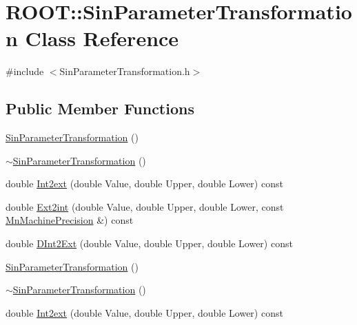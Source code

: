 \hypertarget{classROOT_1_1Minuit2_1_1SinParameterTransformation}{}\section{R\+O\+OT\+:\+:Sin\+Parameter\+Transformation Class Reference}
\label{classROOT_1_1Minuit2_1_1SinParameterTransformation}


{\ttfamily \#include $<$Sin\+Parameter\+Transformation.\+h$>$}

\subsection*{Public Member Functions}
\begin{DoxyCompactItemize}
\item 
\mbox{\hyperlink{classROOT_1_1Minuit2_1_1SinParameterTransformation_a54b8892f35f480210a431f1001634b9c}{Sin\+Parameter\+Transformation}} ()
\item 
\mbox{\hyperlink{classROOT_1_1Minuit2_1_1SinParameterTransformation_a5e6632c4e6006393041a63031b64f823}{$\sim$\+Sin\+Parameter\+Transformation}} ()
\item 
double \mbox{\hyperlink{classROOT_1_1Minuit2_1_1SinParameterTransformation_a53590482bc5734d9f079c8c5054d3de6}{Int2ext}} (double Value, double Upper, double Lower) const
\item 
double \mbox{\hyperlink{classROOT_1_1Minuit2_1_1SinParameterTransformation_a5a98af7b966742b4d3c90ab6d6bbeb5a}{Ext2int}} (double Value, double Upper, double Lower, const \mbox{\hyperlink{classROOT_1_1Minuit2_1_1MnMachinePrecision}{Mn\+Machine\+Precision}} \&) const
\item 
double \mbox{\hyperlink{classROOT_1_1Minuit2_1_1SinParameterTransformation_a4335749e9dd572c2234a8a119893e3fd}{D\+Int2\+Ext}} (double Value, double Upper, double Lower) const
\item 
\mbox{\hyperlink{classROOT_1_1Minuit2_1_1SinParameterTransformation_a54b8892f35f480210a431f1001634b9c}{Sin\+Parameter\+Transformation}} ()
\item 
\mbox{\hyperlink{classROOT_1_1Minuit2_1_1SinParameterTransformation_a5e6632c4e6006393041a63031b64f823}{$\sim$\+Sin\+Parameter\+Transformation}} ()
\item 
double \mbox{\hyperlink{classROOT_1_1Minuit2_1_1SinParameterTransformation_a53590482bc5734d9f079c8c5054d3de6}{Int2ext}} (double Value, double Upper, double Lower) const

\end{DoxyCompactItemize}
